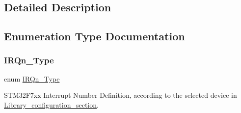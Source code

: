 \subsection{Detailed Description}


\subsection{Enumeration Type Documentation}
\mbox{\label{group___configuration__section__for___c_m_s_i_s_ga7e1129cd8a196f4284d41db3e82ad5c8}} 
\subsubsection{\texorpdfstring{IRQn\_Type}{IRQn\_Type}}
{\footnotesize\ttfamily enum \mbox{\hyperlink{group___configuration__section__for___c_m_s_i_s_ga7e1129cd8a196f4284d41db3e82ad5c8}{I\+R\+Qn\+\_\+\+Type}}}



S\+T\+M32\+F7xx Interrupt Number Definition, according to the selected device in \mbox{\hyperlink{group___library__configuration__section}{Library\+\_\+configuration\+\_\+section}}. 

